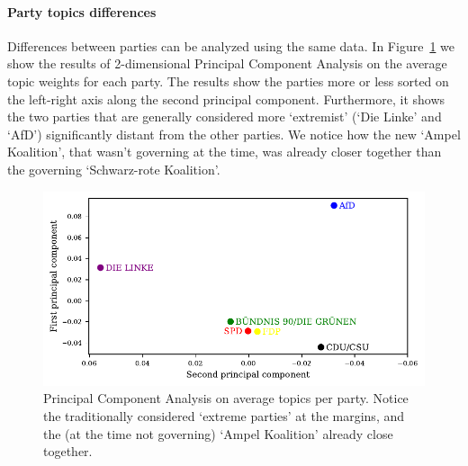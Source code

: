\documentclass{article}
\begin{document}
\paragraph{Party topics differences}
Differences between parties can be analyzed using the same data.
In Figure~\ref{pca_plot} we show the results of 2-dimensional Principal Component Analysis on the average topic weights for each party.
The results show the parties more or less sorted on the left-right axis along the second principal component.
Furthermore, it shows the two parties that are generally considered more `extremist' (`Die Linke' and `AfD') significantly distant from the other parties.
We notice how the new `Ampel Koalition', that wasn't governing at the time, was already closer together than the governing `Schwarz-rote Koalition'.

\begin{figure}
  \centering
  \includegraphics[width=0.9\linewidth]{images/pca.pdf}
  \captionsetup{width=0.9\linewidth}
  \caption{
    Principal Component Analysis on average topics per party.
    Notice the traditionally considered `extreme parties' at the margins, and the (at the time not governing) `Ampel Koalition' already close together.
  }
  \label{pca_plot}
\end{figure}
\end{document}
